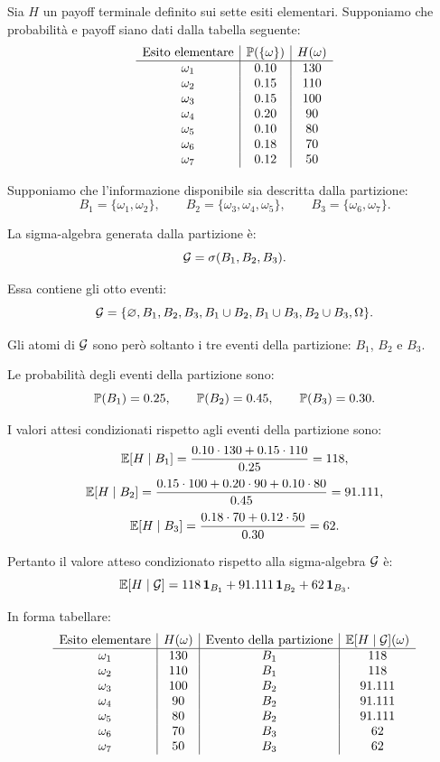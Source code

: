 Sia $H$ un payoff terminale definito sui sette esiti elementari. Supponiamo
che probabilit\`{a} e payoff siano dati dalla tabella seguente:
\[
\begin{array}{c|c|c}
\text{Esito elementare} & \mathbb{P}(\{\omega\}) & H(\omega) \\
\hline
\omega_1 & 0.10 & 130 \\
\omega_2 & 0.15 & 110 \\
\omega_3 & 0.15 & 100 \\
\omega_4 & 0.20 & 90 \\
\omega_5 & 0.10 & 80 \\
\omega_6 & 0.18 & 70 \\
\omega_7 & 0.12 & 50 \\
\end{array}
\]

Supponiamo che l'informazione disponibile sia descritta dalla partizione:
\[
B_1=\{\omega_1,\omega_2\},
\qquad
B_2=\{\omega_3,\omega_4,\omega_5\},
\qquad
B_3=\{\omega_6,\omega_7\}.
\]

La sigma-algebra generata dalla partizione \`{e}:
\[
\mathcal{G}
=
\sigma(B_1,B_2,B_3).
\]

Essa contiene gli otto eventi:
\[
\mathcal{G}
=
\{
\varnothing,
B_1,
B_2,
B_3,
B_1\cup B_2,
B_1\cup B_3,
B_2\cup B_3,
\Omega
\}.
\]

Gli atomi di $\mathcal{G}$ sono per\`{o} soltanto i tre eventi della
partizione: $B_1$, $B_2$ e $B_3$.

Le probabilit\`{a} degli eventi della partizione sono:
\[
\mathbb{P}(B_1)=0.25,
\qquad
\mathbb{P}(B_2)=0.45,
\qquad
\mathbb{P}(B_3)=0.30.
\]

I valori attesi condizionati rispetto agli eventi della partizione sono:
\[
\mathbb{E}[H\mid B_1]
=
\frac{0.10\cdot 130+0.15\cdot 110}{0.25}
=
118,
\]
\[
\mathbb{E}[H\mid B_2]
=
\frac{0.15\cdot 100+0.20\cdot 90+0.10\cdot 80}{0.45}
=
91.111,
\]
\[
\mathbb{E}[H\mid B_3]
=
\frac{0.18\cdot 70+0.12\cdot 50}{0.30}
=
62.
\]

Pertanto il valore atteso condizionato rispetto alla sigma-algebra
$\mathcal{G}$ \`{e}:
\[
\mathbb{E}[H\mid\mathcal{G}]
=
118\,\mathbf{1}_{B_1}
+
91.111\,\mathbf{1}_{B_2}
+
62\,\mathbf{1}_{B_3}.
\]

In forma tabellare:
\[
\begin{array}{c|c|c|c}
\text{Esito elementare} & H(\omega) & \text{Evento della partizione}
& \mathbb{E}[H\mid\mathcal{G}](\omega) \\
\hline
\omega_1 & 130 & B_1 & 118 \\
\omega_2 & 110 & B_1 & 118 \\
\omega_3 & 100 & B_2 & 91.111 \\
\omega_4 & 90  & B_2 & 91.111 \\
\omega_5 & 80  & B_2 & 91.111 \\
\omega_6 & 70  & B_3 & 62 \\
\omega_7 & 50  & B_3 & 62 \\
\end{array}
\]


